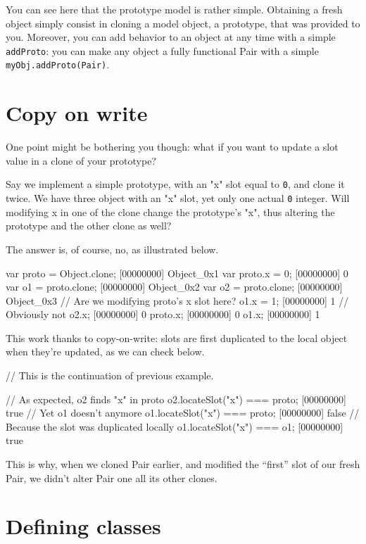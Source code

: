 You can see here that the prototype model is rather simple. Obtaining
a fresh object simply consist in cloning a model object, a prototype,
that was provided to you. Moreover, you can add behavior to an object
at any time with a simple \lstinline{addProto}: you can make any object a
fully functional Pair with a simple \lstinline|myObj.addProto(Pair)|.

\section{Copy on write}

One point might be bothering you though: what if you want to update a
slot value in a clone of your prototype?

Say we implement a simple prototype, with an "x" slot equal to
\lstinline|0|, and clone it twice. We have three object with an "x"
slot, yet only one actual \lstinline|0| integer. Will modifying x in
one of the clone change the prototype's "x", thus altering the
prototype and the other clone as well?

The answer is, of course, no, as illustrated below.

\begin{urbiscript}
var proto = Object.clone;
[00000000] Object_0x1
var proto.x = 0;
[00000000] 0
var o1 = proto.clone;
[00000000] Object_0x2
var o2 = proto.clone;
[00000000] Object_0x3
// Are we modifying proto's x slot here?
o1.x = 1;
[00000000] 1
// Obviously not
o2.x;
[00000000] 0
proto.x;
[00000000] 0
o1.x;
[00000000] 1
\end{urbiscript}

This work thanks to copy-on-write: slots are first duplicated to the
local object when they're updated, as we can check below.

\begin{urbiscript}
// This is the continuation of previous example.

// As expected, o2 finds "x" in proto
o2.locateSlot("x") === proto;
[00000000] true
// Yet o1 doesn't anymore
o1.locateSlot("x") === proto;
[00000000] false
// Because the slot was duplicated locally
o1.locateSlot("x") === o1;
[00000000] true
\end{urbiscript}

This is why, when we cloned Pair earlier, and modified the ``first''
slot of our fresh Pair, we didn't alter Pair one all its other clones.

\section{Defining classes}

